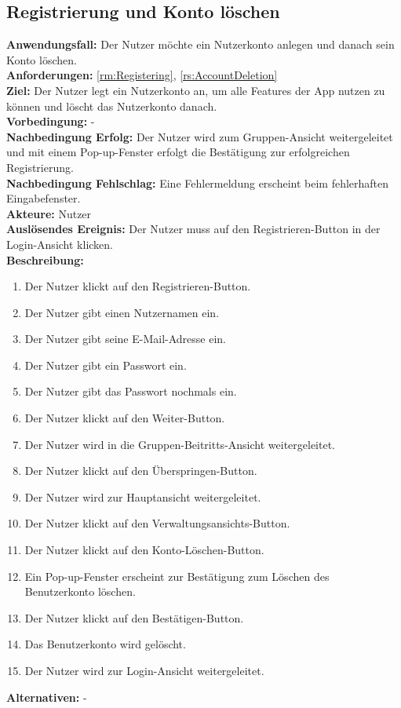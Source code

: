 \documentclass[parskip=full]{scrartcl}
\begin{document}
\subsection{Registrierung und Konto löschen}
\textbf{Anwendungsfall:} Der Nutzer möchte ein Nutzerkonto anlegen und danach sein Konto löschen.\\
\textbf{Anforderungen:} \ref{rm:Registering}, \ref{rs:AccountDeletion} \\
\textbf{Ziel:} Der Nutzer legt ein Nutzerkonto an, um alle Features der App nutzen zu können und löscht das Nutzerkonto danach.\\
\textbf{Vorbedingung:} -\\
\textbf{Nachbedingung Erfolg:} Der Nutzer wird zum Gruppen-Ansicht weitergeleitet und mit einem Pop-up-Fenster erfolgt die Bestätigung zur erfolgreichen Registrierung.\\
\textbf{Nachbedingung Fehlschlag:} Eine Fehlermeldung erscheint beim fehlerhaften Eingabefenster.\\
\textbf{Akteure:} Nutzer\\
\textbf{Auslösendes Ereignis:} Der Nutzer muss auf den Registrieren-Button in der Login-Ansicht klicken.\\
\textbf{Beschreibung:}
\begin{enumerate}
    \item Der Nutzer klickt auf den Registrieren-Button.
    \item Der Nutzer gibt einen Nutzernamen ein.
    \item Der Nutzer gibt seine E-Mail-Adresse ein.
    \item Der Nutzer gibt ein Passwort ein.
    \item Der Nutzer gibt das Passwort nochmals ein.
    \item Der Nutzer klickt auf den Weiter-Button.
    \item Der Nutzer wird in die Gruppen-Beitritts-Ansicht weitergeleitet.
    \item Der Nutzer klickt auf den Überspringen-Button.
    \item Der Nutzer wird zur Hauptansicht weitergeleitet.
    \item Der Nutzer klickt auf den Verwaltungsansichts-Button.
    \item Der Nutzer klickt auf den Konto-Löschen-Button.
    \item Ein Pop-up-Fenster erscheint zur Bestätigung zum Löschen des Benutzerkonto löschen.
    \item Der Nutzer klickt auf den Bestätigen-Button.
    \item Das Benutzerkonto wird gelöscht.
    \item Der Nutzer wird zur Login-Ansicht weitergeleitet.
\end{enumerate}
\textbf{Alternativen:} -
\newpage
\end{document}
